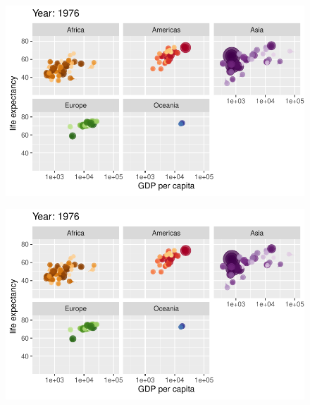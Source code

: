 \documentclass[
  letterpaper,
  DIV=11,
  numbers=noendperiod]{scrartcl}
\begin{document}
\begin{figure}[H]

{\centering \includegraphics{class05_files/figure-pdf/unnamed-chunk-24-44.pdf}

}

\end{figure}

\begin{figure}[H]

{\centering \includegraphics{class05_files/figure-pdf/unnamed-chunk-24-45.pdf}

}

\end{figure}
\end{document}
